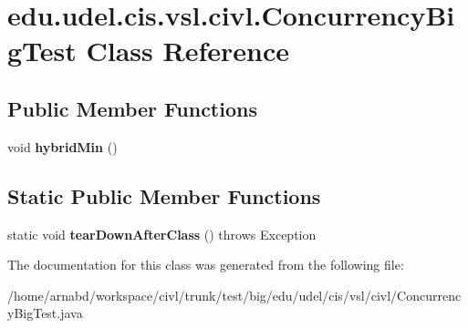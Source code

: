 \hypertarget{classedu_1_1udel_1_1cis_1_1vsl_1_1civl_1_1ConcurrencyBigTest}{}\section{edu.\+udel.\+cis.\+vsl.\+civl.\+Concurrency\+Big\+Test Class Reference}
\label{classedu_1_1udel_1_1cis_1_1vsl_1_1civl_1_1ConcurrencyBigTest}
\subsection*{Public Member Functions}
\begin{DoxyCompactItemize}
\item 
\hypertarget{classedu_1_1udel_1_1cis_1_1vsl_1_1civl_1_1ConcurrencyBigTest_a14ef1632b9f4af27e8104e8c4ed4cffe}{}void {\bfseries hybrid\+Min} ()\label{classedu_1_1udel_1_1cis_1_1vsl_1_1civl_1_1ConcurrencyBigTest_a14ef1632b9f4af27e8104e8c4ed4cffe}

\end{DoxyCompactItemize}
\subsection*{Static Public Member Functions}
\begin{DoxyCompactItemize}
\item 
\hypertarget{classedu_1_1udel_1_1cis_1_1vsl_1_1civl_1_1ConcurrencyBigTest_a0d3ebb78c4813e786aec914722c24e08}{}static void {\bfseries tear\+Down\+After\+Class} ()  throws Exception \label{classedu_1_1udel_1_1cis_1_1vsl_1_1civl_1_1ConcurrencyBigTest_a0d3ebb78c4813e786aec914722c24e08}

\end{DoxyCompactItemize}


The documentation for this class was generated from the following file\+:\begin{DoxyCompactItemize}
\item 
/home/arnabd/workspace/civl/trunk/test/big/edu/udel/cis/vsl/civl/Concurrency\+Big\+Test.\+java\end{DoxyCompactItemize}
